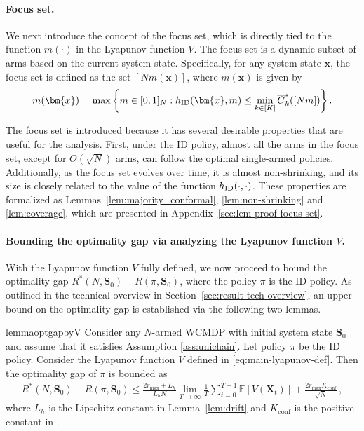 \documentclass{article}
\theoremstyle{plain}
\theoremstyle{remark}
\newcommand{\mx}{\bm{x}}
\newcommand{\ID}{\textnormal{ID}}
\newcommand{\conf}{\text{conf}}
\newcommand{\rembud}{\overline{C}^*} %
\def\mX{{\bm{X}}}
\newcommand{\EE}{\mathbb{E}}
\newcommand{\mbracket}[1]{\left[#1\right]}
\newcommand{\sets}[1]{\left\{ #1 \right\}}
\begin{document}
\paragraph{Focus set.}
We next introduce the concept of the focus set, which is directly tied to the function $m(\cdot)$ in the Lyapunov function $V$.
The focus set is a dynamic subset of arms based on the current system state.
Specifically, for any system state $\mx$, the focus set is defined as the set $[Nm(\mx)]$, where $m(\mx)$ is given by
\begin{align}
    m(\mx)= \max \sets{ m\in[0,1]_N: h_{\ID}(\mx,m)\leq \min_{k\in[K]}\rembud_k([Nm])}.\label{eq:focus set def}
\end{align}

The focus set is introduced because it has several desirable properties that are useful for the analysis.
First, under the ID policy, almost all the arms in the focus set, except for $O(\sqrt{N})$ arms, can follow the optimal single-armed policies.
Additionally, as the focus set evolves over time, it is almost non-shrinking, and its size is closely related to the value of the function $h_{\ID}(\cdot,\cdot)$.
These properties are formalized as Lemmas~\ref{lem:majority_conformal}, \ref{lem:non-shrinking} and \ref{lem:coverage}, which are presented in Appendix~\ref{sec:lem-proof-focus-set}.


\paragraph{Bounding the optimality gap via analyzing the Lyapunov function $V$.}

With the Lyapunov function $V$ fully defined, we now proceed to bound the optimality gap $R^*(N,\bm{S}_0)-R(\pi,\bm{S}_0)$, where the policy $\pi$ is the ID policy.
As outlined in the technical overview in Section~\ref{sec:result-tech-overview}, an upper bound on the optimality gap is established via the following two lemmas.

\begin{restatable}{lemma}{optgapbyV}\label{lem:optimality gap}
Consider any $N$-armed WCMDP with initial system state $\bm{S}_0$ and assume that it satisfies Assumption \ref{ass:unichain}. Let policy $\pi$ be the ID policy.
Consider the Lyapunov function $V$ defined in \eqref{eq:main-lyapunov-def}.
Then the optimality gap of $\pi$ is bounded as
\begin{align*}
    R^*(N,\bm{S}_0)-R(\pi,\bm{S}_0)\leq \frac{2r_{\max}+L_h}{L_h N}\lim_{T\to\infty}\frac{1}{T}\sum_{t=0}^{T-1}\EE\mbracket{V(\mX_{t})} + \frac{2 r_{\max} K_{\conf}}{\sqrt{N}}\,,
\end{align*}
where $L_h$ is the Lipschitz constant in Lemma~\ref{lem:drift} and $K_{\conf}$ is the positive constant in . 
\end{restatable}
\end{document}
